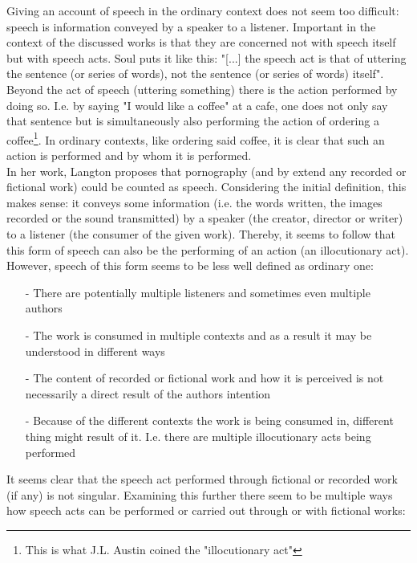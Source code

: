 \documentclass[14pt]{article}
\begin{document}
Giving an account of speech in the ordinary context does not seem too difficult: speech is information conveyed by a speaker to a listener. Important
in the context of the discussed works is that they are concerned not with speech itself but with speech acts. Soul puts it like this:
"[...] the speech act is that of uttering the sentence (or series of words), not the sentence (or series of words) itself"\autocite[p. 235]{Saul}.
Beyond the act of speech (uttering something) there is the action performed by doing so. I.e. by saying "I would like a coffee" at a cafe, one does
not only say that sentence but is simultaneously also performing the action of ordering a 
coffee\footnote{This is what J.L. Austin coined the "illocutionary act"\autocite{Austin}}.
In ordinary contexts, like ordering said coffee, it is clear that such an action is performed and by whom it is performed. \\ 

In her work, Langton proposes that pornography (and by extend any recorded or fictional work) could be counted as speech. Considering the initial definition,
this makes sense: it conveys some information (i.e. the words written, the images recorded or the sound transmitted) by a
speaker (the creator, director or writer) to a listener (the consumer of the given work). Thereby, it seems to follow that this form of speech can
also be the performing of an action (an illocutionary act)\autocite{Langton}. However, speech of this form seems to be less well defined as ordinary
one:

\begin{enumerate}
  \item[-] There are potentially multiple listeners and sometimes even multiple authors
  \item[-] The work is consumed in multiple contexts and as a result it may be understood in different ways
  \item[-] The content of recorded or fictional work and how it is perceived is not necessarily a direct result of the authors intention
  \item[-] Because of the different contexts the work is being consumed in, different thing might result of it.
  I.e. there are multiple illocutionary acts being performed
\end{enumerate}

It seems clear that the speech act performed through fictional or recorded work (if any) is not singular. Examining this further there seem to be multiple 
ways how speech acts can be performed or carried out through or with fictional works:
\end{document}

